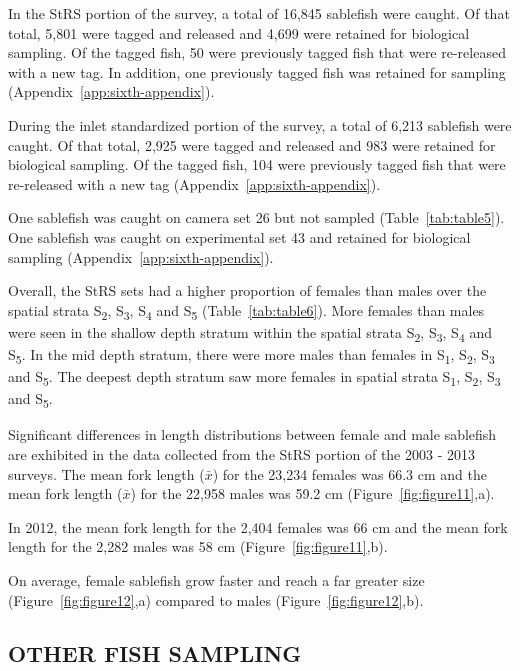 \documentclass[12pt]{article}\usepackage[]{graphicx}\usepackage[]{color}
\begin{document}
In the StRS portion of the survey, a total of 16,845 sablefish were caught. Of that total, 5,801 were tagged and released and 4,699 were retained for biological sampling. Of the tagged fish, 50 were previously tagged fish that were re-released with a new tag. In addition, one previously tagged fish was retained for sampling (Appendix~\ref{app:sixth-appendix}).

During the inlet standardized portion of the survey, a total of 6,213 sablefish were caught. Of that total, 2,925 were tagged and released and 983 were retained for biological sampling. Of the tagged fish, 104 were previously tagged fish that were re-released with a new tag (Appendix~\ref{app:sixth-appendix}).

One sablefish was caught on camera set 26 but not sampled (Table~\ref{tab:table5}). One sablefish was caught on experimental set 43 and retained for biological sampling (Appendix~\ref{app:sixth-appendix}).

Overall, the StRS sets had a higher proportion of females than males over the spatial strata S\textsubscript{2}, S\textsubscript{3}, S\textsubscript{4} and S\textsubscript{5} (Table~\ref{tab:table6}). More females than males were seen in the shallow depth stratum within the spatial strata S\textsubscript{2}, S\textsubscript{3}, S\textsubscript{4} and S\textsubscript{5}. In the mid depth stratum, there were more males than females in S\textsubscript{1}, S\textsubscript{2}, S\textsubscript{3} and S\textsubscript{5}. The deepest depth stratum saw more females in spatial strata S\textsubscript{1}, S\textsubscript{2}, S\textsubscript{3} and S\textsubscript{5}.

Significant differences in length distributions between female and male sablefish are exhibited in the data collected from the StRS portion of the 2003 - 2013 surveys. The mean fork length (\(\bar{x}\)) for the 23,234 females was 66.3 cm and the mean fork length (\(\bar{x}\)) for the 22,958 males was 59.2 cm (Figure~\ref{fig:figure11},a).

In 2012, the mean fork length for the 2,404 females was 66 cm and the mean fork length for the 2,282 males was 58 cm (Figure~\ref{fig:figure11},b).

On average, female sablefish grow faster and reach a far greater size (Figure~\ref{fig:figure12},a) compared to males (Figure~\ref{fig:figure12},b).

\hypertarget{other-fish-sampling}{%
\subsection{OTHER FISH SAMPLING}\label{other-fish-sampling}}
\end{document}

